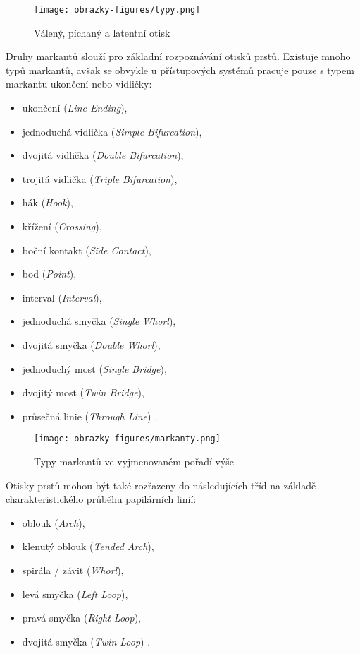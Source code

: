 \begin{figure}[!htbp]
    \centering
    \texttt{[image: obrazky-figures/typy.png]}
    \caption{Válený, píchaný a latentní otisk \cite{BIOopora}}
\end{figure}

Druhy markantů slouží pro základní rozpoznávání otisků prstů. Existuje mnoho typů markantů, avšak se obvykle u přístupových systémů pracuje pouze s typem markantu ukončení nebo vidličky:

\begin{itemize}
    \item ukončení (\textit{Line Ending}),
    \item jednoduchá vidlička (\textit{Simple Bifurcation}),
    \item dvojitá vidlička (\textit{Double Bifurcation}),
    \item trojitá vidlička (\textit{Triple Bifurcation}),
    \item hák (\textit{Hook}),
    \item křížení (\textit{Crossing}),
    \item boční kontakt (\textit{Side Contact}),
    \item bod (\textit{Point}),
    \item interval (\textit{Interval}),
    \item jednoduchá smyčka (\textit{Single Whorl}),
    \item dvojitá smyčka (\textit{Double Whorl}),
    \item jednoduchý most (\textit{Single Bridge}),
    \item dvojitý most (\textit{Twin Bridge}),
    \item průsečná linie (\textit{Through Line}) \cite{BIOopora}.\\
\end{itemize}

\begin{figure}[!htbp]
    \centering
    \texttt{[image: obrazky-figures/markanty.png]}
    \caption{Typy markantů ve vyjmenovaném pořadí výše \cite{BIOopora}}
\end{figure}

Otisky prstů mohou být také rozřazeny do následujících tříd na základě charakteristického průběhu papilárních linií:
\begin{itemize}
    \item oblouk (\textit{Arch}),
    \item klenutý oblouk (\textit{Tended Arch}),
    \item spirála / závit (\textit{Whorl}),
    \item levá smyčka (\textit{Left Loop}),
    \item pravá smyčka (\textit{Right Loop}),
    \item dvojitá smyčka (\textit{Twin Loop}) \cite{BIOopora}.
\end{itemize}

